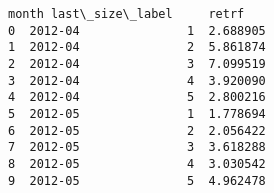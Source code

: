 \documentclass[11pt]{article}
\makeatletter
\newcommand{\boxspacing}{\kern\kvtcb@left@rule\kern\kvtcb@boxsep}
\newcommand{\prompt}[4]{
        {\ttfamily\llap{{\color{#2}[#3]:\hspace{3pt}#4}}\vspace{-\baselineskip}}
    }
\makeatother
\begin{document}
            \begin{tcolorbox}[breakable, size=fbox, boxrule=.5pt, pad at break*=1mm, opacityfill=0]
\prompt{Out}{outcolor}{4}{\boxspacing}
\begin{Verbatim}[commandchars=\\\{\}]
     month last\_size\_label     retrf
0  2012-04               1  2.688905
1  2012-04               2  5.861874
2  2012-04               3  7.099519
3  2012-04               4  3.920090
4  2012-04               5  2.800216
5  2012-05               1  1.778694
6  2012-05               2  2.056422
7  2012-05               3  3.618288
8  2012-05               4  3.030542
9  2012-05               5  4.962478
\end{Verbatim}
\end{tcolorbox}
        
\end{document}
